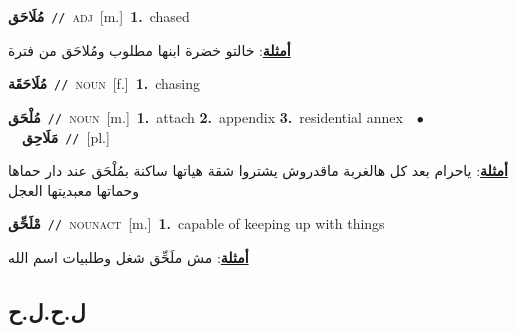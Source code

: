 \documentclass[10pt,a4paper,twoside]{article} %
\begin{document}
\begin{multicols}{2}
{\setlength\topsep{0pt}\textbf{\foreignlanguage{arabic}{مُلَاحَق}}\ {\color{gray}\texttt{//}\color{black}}\ \textsc{adj}\ [m.]\ \textbf{1.}~chased\  \begin{flushright}\color{gray}\foreignlanguage{arabic}{\textbf{\underline{\foreignlanguage{arabic}{أمثلة}}}: خالتو خضرة ابنها مطلوب ومُلاحَق من فترة}\end{flushright}\color{black}} \vspace{2mm}

{\setlength\topsep{0pt}\textbf{\foreignlanguage{arabic}{مُلَاحَقَة}}\ {\color{gray}\texttt{//}\color{black}}\ \textsc{noun}\ [f.]\ \textbf{1.}~chasing\ } \vspace{2mm}

{\setlength\topsep{0pt}\textbf{\foreignlanguage{arabic}{مُلْحَق}}\ {\color{gray}\texttt{//}\color{black}}\ \textsc{noun}\ [m.]\ \textbf{1.}~attach  \textbf{2.}~appendix  \textbf{3.}~residential annex\ \ $\bullet$\ \ \setlength\topsep{0pt}\textbf{\foreignlanguage{arabic}{مَلَاحِق}}\ {\color{gray}\texttt{//}\color{black}}\ [pl.]\  \begin{flushright}\color{gray}\foreignlanguage{arabic}{\textbf{\underline{\foreignlanguage{arabic}{أمثلة}}}: ياحرام بعد كل هالغربة ماقدروش يشتروا شقة هياتها ساكنة بمُلْحَق عند دار حماها وحماتها معبديتها العجل}\end{flushright}\color{black}} \vspace{2mm}

{\setlength\topsep{0pt}\textbf{\foreignlanguage{arabic}{مْلَحِّق}}\ {\color{gray}\texttt{//}\color{black}}\ \textsc{noun\textunderscore act}\ [m.]\ \textbf{1.}~capable of keeping up with things\  \begin{flushright}\color{gray}\foreignlanguage{arabic}{\textbf{\underline{\foreignlanguage{arabic}{أمثلة}}}: مش ملَحِّق شغل وطلبيات اسم الله}\end{flushright}\color{black}} \vspace{2mm}

\vspace{-3mm}
\subsection*{\color{blue}\foreignlanguage{arabic}{ل.ح.ل.ح}\color{blue}{}} 


\end{multicols}
\end{document}
